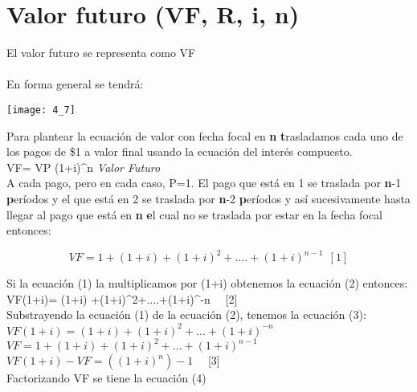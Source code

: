 \section{Valor futuro (VF, R, i, n)}
El valor futuro se representa como VF
\\\\
En forma general se tendrá:

\begin{center}
	\texttt{[image: 4\_7]}
\end{center}

Para plantear la ecuación de valor con fecha focal en \textbf n \textbf trasladamos cada uno de los pagos de \$1  a valor final usando la ecuación del interés  compuesto.\\


	VF= VP (1+i)^{n} \hspace{35} \textit{Valor Futuro} \\


A cada pago, pero en cada caso, P=1. El pago que está en 1 se traslada por \textbf n-1 \textbf períodos y el que está en 2 se traslada por \textbf n-2  \textbf períodos y así sucesivamente hasta llegar al pago que está en \textbf n \textbf el cual no se traslada por estar  en la fecha focal entonces:

\begin{equation*}
	VF=1+ (1+i) +(1+i)^{2}+....+(1+i)^{n-1}  \ \ [1]
\end{equation*}

Si la ecuación (1) la multiplicamos por (1+i) obtenemos la ecuación (2) entonces:\\


	VF(1+i)= (1+i) +(1+i)^{2}+....+(1+i)^{-n} \ \ [2]\\

Substrayendo la ecuación (1) de la ecuación (2), tenemos la ecuación (3):\\

		$VF(1+i)= (1+i)+(1+i)^{2}+...+(1+i)^{-n}$
		\\
		$VF=1+(1+i)+(1+i)^{2}+...+(1+i)^{n-1}$ \\ 
		$VF (1+i) - VF = ((1+i)^{n}) -1$ \ \ [3]\\

Factorizando VF se tiene la ecuación (4)\\

